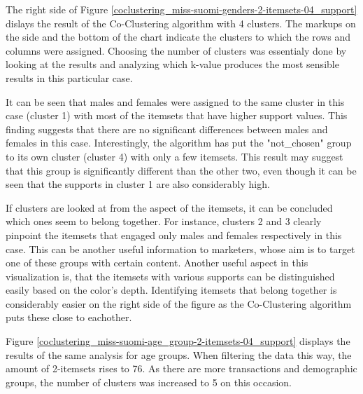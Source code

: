 The right side of Figure \ref{coclustering_miss-suomi-genders-2-itemsets-04_support} dislays the result of the Co-Clustering algorithm with 4 clusters. The markups on the side and the bottom of the chart indicate the clusters to which the rows and columns were assigned. Choosing the number of clusters was essentialy done by looking at the results and analyzing which k-value produces the most sensible results in this particular case. 

It can be seen that males and females were assigned to the same cluster in this case (cluster 1) with most of the itemsets that have higher support values. This finding suggests that there are no significant differences between males and females in this case. Interestingly, the algorithm has put the "not\_chosen" group to its own cluster (cluster 4) with only a few itemsets. This result may suggest that this group is significantly different than the other two, even though it can be seen that the supports in cluster 1 are also considerably high. 

If clusters are looked at from the aspect of the itemsets, it can be concluded which ones seem to belong together. For instance, clusters 2 and 3 clearly pinpoint the itemsets that engaged only males and females respectively in this case. This can be another useful information to marketers, whose aim is to target one of these groups with certain content. Another useful aspect in this visualization is, that the itemsets with various supports can be distinguished easily based on the color's depth. Identifying itemsets that belong together is considerably easier on the right side of the figure as the Co-Clustering algorithm puts these close to eachother. 

Figure \ref{coclustering_miss-suomi-age_group-2-itemsets-04_support} displays the results of the same analysis for age groups. When filtering the data this way, the amount of 2-itemsets rises to 76. As there are more transactions and demographic groups, the number of clusters was increased to 5 on this occasion. 

